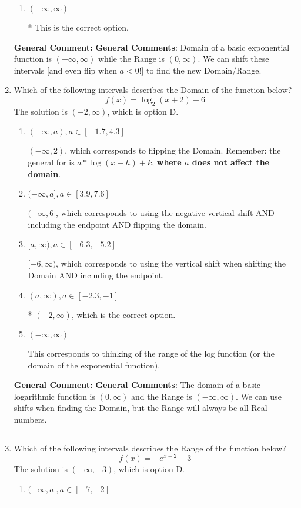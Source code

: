 \documentclass{extbook}[14pt]
\newcommand{\litem}[1]{\item #1

\rule{\textwidth}{0.4pt}}
\begin{document}
\begin{enumerate}
{\begin{enumerate}[label=\Alph*.]
$(-\infty, -2]$, which corresponds to using the correct vertical shift *if we wanted the Range* AND including the endpoint.
\item \( (-\infty, \infty) \)

* This is the correct option.
\end{enumerate}

\textbf{General Comment:} \textbf{General Comments}: Domain of a basic exponential function is $(-\infty, \infty)$ while the Range is $(0, \infty)$. We can shift these intervals [and even flip when $a<0$!] to find the new Domain/Range.
}
\litem{
Which of the following intervals describes the Domain of the function below?
\[ f(x) = \log_2{(x+2)}-6 \]The solution is \( (-2, \infty) \), which is option D.\begin{enumerate}[label=\Alph*.]
\item \( (-\infty, a), a \in [-1.7, 4.3] \)

$(-\infty, 2)$, which corresponds to flipping the Domain. Remember: the general for is $a*\log(x-h)+k$, \textbf{where $a$ does not affect the domain}.
\item \( (-\infty, a], a \in [3.9, 7.6] \)

$(-\infty, 6]$, which corresponds to using the negative vertical shift AND including the endpoint AND flipping the domain.
\item \( [a, \infty), a \in [-6.3, -5.2] \)

$[-6, \infty)$, which corresponds to using the vertical shift when shifting the Domain AND including the endpoint.
\item \( (a, \infty), a \in [-2.3, -1] \)

* $(-2, \infty)$, which is the correct option.
\item \( (-\infty, \infty) \)

This corresponds to thinking of the range of the log function (or the domain of the exponential function).
\end{enumerate}

\textbf{General Comment:} \textbf{General Comments}: The domain of a basic logarithmic function is $(0, \infty)$ and the Range is $(-\infty, \infty)$. We can use shifts when finding the Domain, but the Range will always be all Real numbers.
}
\litem{
Which of the following intervals describes the Range of the function below?
\[ f(x) = -e^{x+2}-3 \]The solution is \( (-\infty, -3) \), which is option D.\begin{enumerate}[label=\Alph*.]
\item \( (-\infty, a], a \in [-7, -2] \)


\end{enumerate}}
\end{enumerate}
\end{document}
